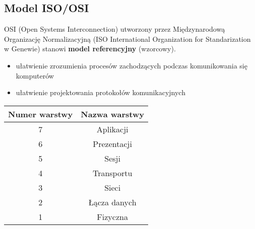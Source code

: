 \documentclass[a4paper]{article}
\begin{document}
\subsection{Model ISO/OSI}
OSI (Open Systems Interconnection) utworzony przez Międzynarodową Organizację
Normalizacyjną (ISO International Organization for Standarization w Genewie)
stanowi \textbf{model referencyjny} (wzorcowy).

\begin{itemize}
    \item ułatwienie zrozumienia procesów zachodzących podczas komunikowania się komputerów
    \item ułatwienie projektowania protokołów komunikacyjnych
\end{itemize}

\begin{tabular}{|c|c|}
\hline
\textbf{Numer warstwy} & \textbf{Nazwa warstwy}\\
\hline
7 & Aplikacji\\
\hline
6 & Prezentacji\\
\hline
5 & Sesji\\
\hline
4 & Transportu\\
\hline
3 & Sieci\\
\hline
2 & Łącza danych\\
\hline
1 & Fizyczna\\
\hline
\end{tabular}
\end{document}
